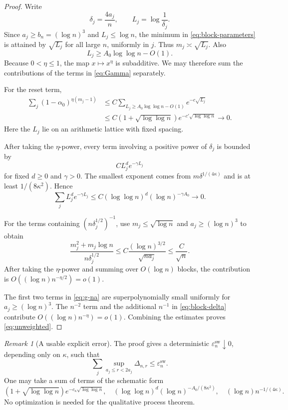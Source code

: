 \documentclass[11pt]{article}
\theoremstyle{definition}
\theoremstyle{remark}
\newtheorem{remark}[theorem]{Remark}
\begin{document}
\begin{proof}
Write
\[
 \delta_j=\frac{4a_j}{n},
 \qquad
 L_j=\log\frac1{\delta_j}.
\]
Since $a_j\ge b_n=(\log n)^3$ and $L_j\le\log n$, the minimum in
\eqref{eq:block-parameters} is attained by $\sqrt{L_j}$ for all large $n$,
uniformly in $j$.  Thus $m_j\asymp\sqrt{L_j}$.  Also
\begin{equation}\label{eq:Lj-min}
 L_j\ge A_0\log\log n-O(1).
\end{equation}
Because $0<\eta\le1$, the map $x\mapsto x^\eta$ is subadditive.  We may
therefore sum the contributions of the terms in \eqref{eq:Gamma}
separately.

For the reset term,
\begin{align*}
 \sum_j(1-\alpha_0)^{\eta(m_j-1)}
 &\le C\sum_{L_j\ge A_0\log\log n-O(1)}e^{-c\sqrt{L_j}}\\
 &\le C(1+\sqrt{\log\log n})
 e^{-c'\sqrt{\log\log n}}
 \longrightarrow0.
\end{align*}
Here the $L_j$ lie on an arithmetic lattice with fixed spacing.

After taking the $\eta$-power, every term involving a positive power of
$\delta_j$ is bounded by
\[
 C L_j^d e^{-\gamma L_j}
\]
for fixed $d\ge0$ and $\gamma>0$.  The smallest exponent comes from
$m\delta^{1/(4\kappa)}$ and is at least $1/(8\kappa^2)$.  Hence
\begin{equation}\label{eq:delta-sum}
 \sum_j L_j^d e^{-\gamma L_j}
 \le C(\log\log n)^d(\log n)^{-\gamma A_0}
 \longrightarrow0.
\end{equation}

For the terms containing $(n\delta_j^{1/2})^{-1}$, use
$m_j\le\sqrt{\log n}$ and $a_j\ge(\log n)^3$ to obtain
\[
 \frac{m_j^2+m_j\log n}{n\delta_j^{1/2}}
 \le C\frac{(\log n)^{3/2}}{\sqrt{na_j}}
 \le \frac{C}{\sqrt n}.
\]
After taking the $\eta$-power and summing over $O(\log n)$ blocks, the
contribution is $O((\log n)n^{-\eta/2})=o(1)$.

The first two terms in \eqref{eq:g-na} are superpolynomially small uniformly
for $a_j\ge(\log n)^3$.  The $n^{-2}$ term and the additional $n^{-1}$ in
\eqref{eq:block-delta} contribute $O((\log n)n^{-\eta})=o(1)$.  Combining
the estimates proves \eqref{eq:unweighted}.
\end{proof}

\begin{remark}[A usable explicit error]
\label{rem:explicit-unweighted}
The proof gives a deterministic $\varepsilon_n^{\mathrm{sw}}\downarrow0$,
depending only on $\kappa$, such that
\[
 \sum_j\sup_{a_j\le r<2a_j}\Delta_{n,r}
 \le\varepsilon_n^{\mathrm{sw}}.
\]
One may take a sum of terms of the schematic form
\[
 (1+\sqrt{\log\log n})e^{-c_\kappa\sqrt{\log\log n}},
 \quad
 (\log\log n)^d(\log n)^{-A_0/(8\kappa^2)},
 \quad
 (\log n)n^{-1/(4\kappa)}.
\]
No optimization is needed for the qualitative process theorem.
\end{remark}
\end{document}
